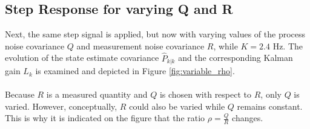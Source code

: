 \documentclass[a4paper,kul]{kulakarticle} %
\begin{document}
\subsection{Step Response for varying Q and R}
\label{subsec:33}
Next, the same step signal is applied, but now with varying values of the process noise covariance $Q$ and measurement noise covariance $R$, while $K = 2.4$ Hz. The evolution of the state estimate covariance $\hat{P}_{k|k}$ and the corresponding Kalman gain $L_k$ is examined and depicted in Figure \ref{fig:variable_rho}. 
\\\\
Because $R$ is a measured quantity and $Q$ is chosen with respect to $R$, only $Q$ is varied. However, conceptually, $R$ could also be varied while $Q$ remains constant. This is why it is indicated on the figure that the ratio $\rho = \frac{Q}{R}$ changes.
\end{document}
